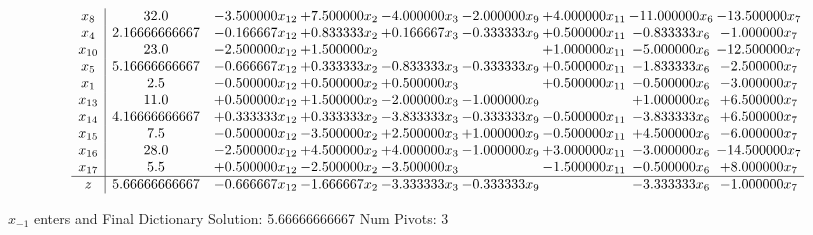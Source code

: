 \documentclass[10pt]{article}
\begin{document}
 \[\begin{array}{c| c c@{\hskip 2pt} c@{\hskip 2pt} c@{\hskip 2pt} c@{\hskip 2pt} c@{\hskip 2pt} c@{\hskip 2pt} c@{\hskip 2pt} }
 x_{8}   &  32.0 & -3.500000 x_{12} & + 7.500000 x_{2} & -4.000000 x_{3} & -2.000000 x_{9} & + 4.000000 x_{11} & -11.000000 x_{6} & -13.500000 x_{7}\\
 x_{4}   &  2.16666666667 & -0.166667 x_{12} & + 0.833333 x_{2} & + 0.166667 x_{3} & -0.333333 x_{9} & + 0.500000 x_{11} & -0.833333 x_{6} & -1.000000 x_{7}\\
 x_{10}   &  23.0 & -2.500000 x_{12} & + 1.500000 x_{2} &    &   & + 1.000000 x_{11} & -5.000000 x_{6} & -12.500000 x_{7}\\
 x_{5}   &  5.16666666667 & -0.666667 x_{12} & + 0.333333 x_{2} & -0.833333 x_{3} & -0.333333 x_{9} & + 0.500000 x_{11} & -1.833333 x_{6} & -2.500000 x_{7}\\
 x_{1}   &  2.5 & -0.500000 x_{12} & + 0.500000 x_{2} & + 0.500000 x_{3} &   & + 0.500000 x_{11} & -0.500000 x_{6} & -3.000000 x_{7}\\
 x_{13}   &  11.0 & + 0.500000 x_{12} & + 1.500000 x_{2} & -2.000000 x_{3} & -1.000000 x_{9} &   & + 1.000000 x_{6} & + 6.500000 x_{7}\\
 x_{14}   &  4.16666666667 & + 0.333333 x_{12} & + 0.333333 x_{2} & -3.833333 x_{3} & -0.333333 x_{9} & -0.500000 x_{11} & -3.833333 x_{6} & + 6.500000 x_{7}\\
 x_{15}   &  7.5 & -0.500000 x_{12} & -3.500000 x_{2} & + 2.500000 x_{3} & + 1.000000 x_{9} & -0.500000 x_{11} & + 4.500000 x_{6} & -6.000000 x_{7}\\
 x_{16}   &  28.0 & -2.500000 x_{12} & + 4.500000 x_{2} & + 4.000000 x_{3} & -1.000000 x_{9} & + 3.000000 x_{11} & -3.000000 x_{6} & -14.500000 x_{7}\\
 x_{17}   &  5.5 & + 0.500000 x_{12} & -2.500000 x_{2} & -3.500000 x_{3} &   & -1.500000 x_{11} & -0.500000 x_{6} & + 8.000000 x_{7}\\
\hline
z    &  5.66666666667 & -0.666667 x_{12} & -1.666667 x_{2} & -3.333333 x_{3} & -0.333333 x_{9} &   & -3.333333 x_{6} & -1.000000 x_{7}\\
\end{array}\]


 $ x_{-1} $ enters and Final Dictionary
Solution:  5.66666666667
Num Pivots:  3
\end{document}
